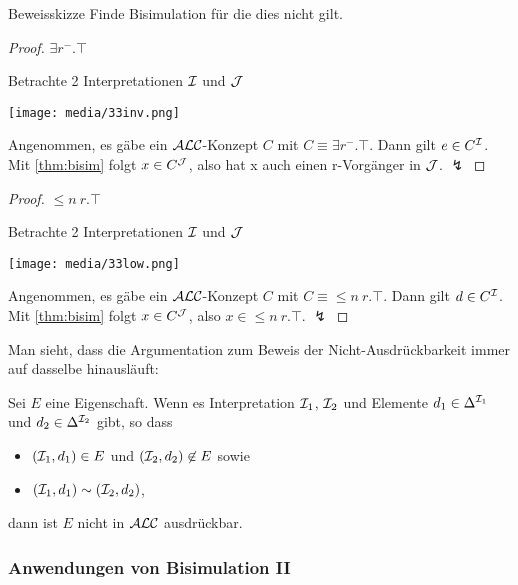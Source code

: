 \begin{tafel}{Beweisskizze} Finde Bisimulation für die dies nicht gilt.

\begin{proof} $\exists r^{-}.\top$

 Betrachte 2 Interpretationen $\mathcal{I}$ und $\mathcal{J}$

\texttt{[image: media/33inv.png]}

Angenommen, es gäbe ein $\mathcal{A}\mathcal{L}\mathcal{C}$-Konzept $C$ mit $C \equiv \exists r^{-}.\top$. Dann gilt $e \in C^{\mathcal{I}}$. Mit \autoref{thm:bisim} folgt $x \in C^{\mathcal{J}}$, also hat x auch einen r-Vorgänger in $\mathcal{J}$. $\lightning$
\end{proof} 

\begin{proof} $\leq n\ r.\top$

Betrachte 2 Interpretationen $\mathcal{I}$ und $\mathcal{J}$

\texttt{[image: media/33low.png]}

Angenommen, es gäbe ein $\mathcal{A}\mathcal{L}\mathcal{C}$-Konzept $C$ mit $C \equiv \leq n\ r.\top$. Dann gilt $d \in C^{\mathcal{I}}$. Mit \autoref{thm:bisim} folgt $x \in C^{\mathcal{J}}$, also $x \in \leq n\ r.\top$. $\lightning$
\end{proof}
\end{tafel}

Man sieht, dass die Argumentation zum Beweis der Nicht-Ausdrückbarkeit immer auf dasselbe hinausläuft:

\begin{theorem}
    \label{thm:alc-nicht-ausdruck}
Sei $E$ eine Eigenschaft. Wenn es Interpretation $\mathcal{I}_{1}$, $\mathcal{I}_{2}$
und Elemente $d_{1} \in \Delta^{\mathcal{I}_{1}}$ und
$d_{2} \in \Delta^{\mathcal{I}_{2}}$ gibt, so dass

\begin{itemize}
\item
  $\left( \mathcal{I}_{1},d_{1} \right) \in E$ und
  $\left( \mathcal{I}_{2},d_{2} \right) \not\in E$ sowie
\item
  $(\mathcal{I}_{1},d_{1}) \sim (\mathcal{I}_{2},d_{2})$,
\end{itemize}

dann ist $E$ nicht in $\mathcal{A}\mathcal{L}\mathcal{C}$ ausdrückbar.
\end{theorem}

\subsubsection{Anwendungen von Bisimulation II}

